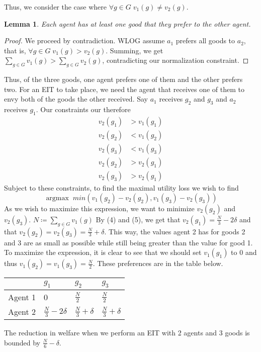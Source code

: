 \documentclass[12pt,letterpaper]{article}
\newcommand{\argmax}{\mathop{\arg\max}}
\newtheorem{lemma}[theorem]{Lemma}
\theoremstyle{remark}
\theoremstyle{definition}
\begin{document}
Thus, we consider the case where $\forall g \in G \; v_1(g) \neq v_2(g)$.  
\begin{lemma}
Each agent has at least one good that they prefer to the other agent.  
\end{lemma}
\begin{proof}
We proceed by contradiction.  WLOG assume $a_1$ prefers all goods to $a_2$, that is, $\forall g \in G \; v_1(g) > v_2(g)$.  Summing, we get $\sum_{g\in G} v_1(g) > \sum_{g\in G} v_2(g)$, contradicting our normalization constraint.   
\end{proof}

Thus, of the three goods, one agent prefers one of them and the other prefers two.  For an EIT to take place, we need the agent that receives one of them to envy both of the goods the other received.  Say $a_1$ receives $g_2$ and $g_3$ and $a_2$ receives $g_1$.  Our constraints our therefore 
\begin{align}
    v_2(g_1) &> v_1(g_1)\\
    v_2(g_2) &< v_1(g_2) \\
    v_2(g_3) &< v_1(g_3) \\
    v_2(g_2) &> v_2(g_1) \\
    v_2(g_3) &> v_2(g_1)
\end{align}
Subject to these constraints, to find the maximal utility loss we wish to find 
$$ \argmax \; min (v_1(g_2) - v_2(g_2),v_1(g_3) - v_2(g_3))  $$ 
As we wish to maximize this expression, we want to minimize $v_2(g_2)$ and $v_2(g_3)$.  $N\coloneq\sum_{g\in G} v_1(g)$ By (4) and (5), we get that $v_2(g_1) = \frac{N}{3} - 2\delta$ and that $v_2(g_2) = v_2(g_3) = \frac{N}{3} + \delta$.  This way, the values agent 2 has for goods 2 and 3 are as small as possible while still being greater than the value for good 1.  To maximize the expression, it is clear to see that we should set $v_1(g_1)$ to 0 and thus $v_1(g_2) = v_1(g_3) = \frac{N}{2}$.  These preferences are in the table below.  

  \begin{table}[hb]
\centering
\begin{tabular}{llll}
\toprule
& $g_1$ & $g_2$& $g_3$ \\
\midrule
Agent 1 & 0 & $\frac{N}{2}$ & $\frac{N}{2}$ \\
\midrule
Agent 2 & $\frac{N}{3} - 2\delta$ & $\frac{N}{3} + \delta$  & $\frac{N}{3}+\delta$\\
\bottomrule
\end{tabular}
\end{table} 
The reduction in welfare when we perform an EIT with 2 agents and 3 goods is bounded by $\frac{N}{6} - \delta$.  
\end{document}
